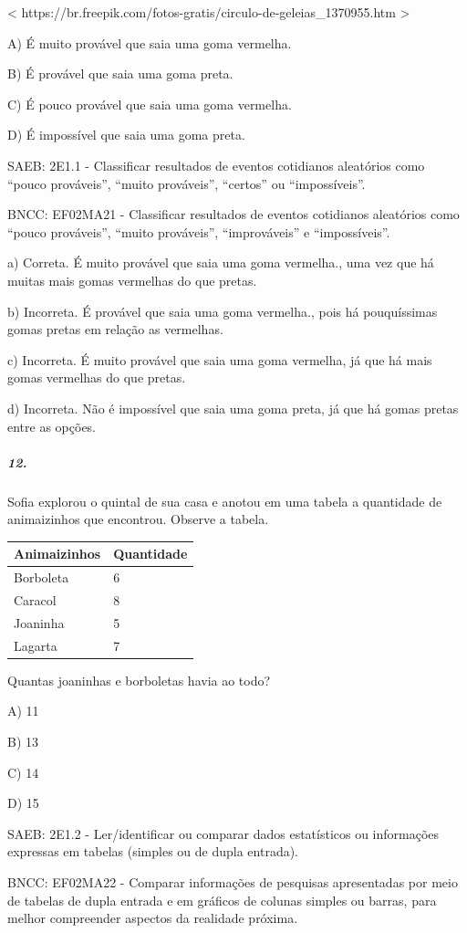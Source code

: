 \textless{}
https://br.freepik.com/fotos-gratis/circulo-de-geleias\_1370955.htm
\textgreater{}

A) É muito provável que saia uma goma vermelha.

B) É provável que saia uma goma preta.

C) É pouco provável que saia uma goma vermelha.

D) É impossível que saia uma goma preta.

SAEB: 2E1.1 - Classificar resultados de eventos cotidianos aleatórios
como ``pouco prováveis'', ``muito prováveis'', ``certos'' ou
``impossíveis''.

BNCC: EF02MA21 - Classificar resultados de eventos cotidianos aleatórios
como ``pouco prováveis'', ``muito prováveis'', ``improváveis'' e
``impossíveis''.

a) Correta. É muito provável que saia uma goma vermelha., uma vez que há
muitas mais gomas vermelhas do que pretas.

b) Incorreta. É provável que saia uma goma vermelha., pois há
pouquíssimas gomas pretas em relação as vermelhas.

c) Incorreta. É muito provável que saia uma goma vermelha, já que há
mais gomas vermelhas do que pretas.

d) Incorreta. Não é impossível que saia uma goma preta, já que há gomas
pretas entre as opções.

\subparagraph{12. }\label{section-126}

Sofia explorou o quintal de sua casa e anotou em uma tabela a quantidade
de animaizinhos que encontrou. Observe a tabela.

\begin{longtable}[]{@{}ll@{}}
\toprule
Animaizinhos & Quantidade\tabularnewline
\midrule
\endhead
Borboleta & 6\tabularnewline
Caracol & 8\tabularnewline
Joaninha & 5\tabularnewline
Lagarta & 7\tabularnewline
\bottomrule
\end{longtable}

Quantas joaninhas e borboletas havia ao todo?

A) 11

B) 13

C) 14

D) 15

SAEB: 2E1.2 - Ler/identificar ou comparar dados estatísticos ou
informações expressas em tabelas (simples ou de dupla entrada).

BNCC: EF02MA22 - Comparar informações de pesquisas apresentadas por meio
de tabelas de dupla entrada e em gráficos de colunas simples ou barras,
para melhor compreender aspectos da realidade próxima.


